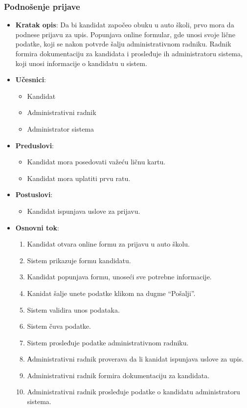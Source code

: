 \subsubsection{Podnošenje prijave}
\label{subsubsec:prijava}
\begin{itemize}
  \item \textbf{Kratak opis}: Da bi kandidat započeo obuku u auto školi, prvo mora da podnese prijavu za upis. Popunjava online formular, gde unosi svoje lične podatke, koji se nakon potvrde šalju administrativnom radniku. Radnik formira dokumentaciju za kandidata i prosleđuje ih administratoru sistema, koji unosi informacije o kandidatu u sistem.
  \item \textbf{Učesnici}: 
  \begin{itemize} 
    \item Kandidat
    \item Administrativni radnik
    \item Administrator sistema
  \end{itemize} 
  \item \textbf{Preduslovi}:
    \begin{itemize}
    \item Kandidat mora posedovati važeću ličnu kartu.
    \item Kandidat mora uplatiti prvu ratu.
    \end{itemize}
  \item \textbf{Postuslovi}:
      \begin{itemize}
      \item Kandidat ispunjava uslove za prijavu.
      \end{itemize}
  \item \textbf{Osnovni tok}:
      \begin{enumerate}
        \item Kandidat otvara online formu za prijavu u auto školu.
        \item Sistem prikazuje formu kandidatu.
        \item Kandidat popunjava formu, unoseći sve potrebne informacije.
        \item Kanidat šalje unete podatke klikom na dugme “Pošalji”.
        \item Sistem validira unos podataka.
        \item Sistem čuva podatke.
        \item Sistem prosleđuje podatke administrativnom radniku.
        \item Аdministrativni radnik proverava da li kanidat ispunjava uslove za upis.
        \item Administrativni radnik formira dokumentaciju za kandidata.
        \item Administrativni radnik prosleđuje podatke o kandidatu administratoru sistema.
      \end{enumerate}


\end{itemize}
